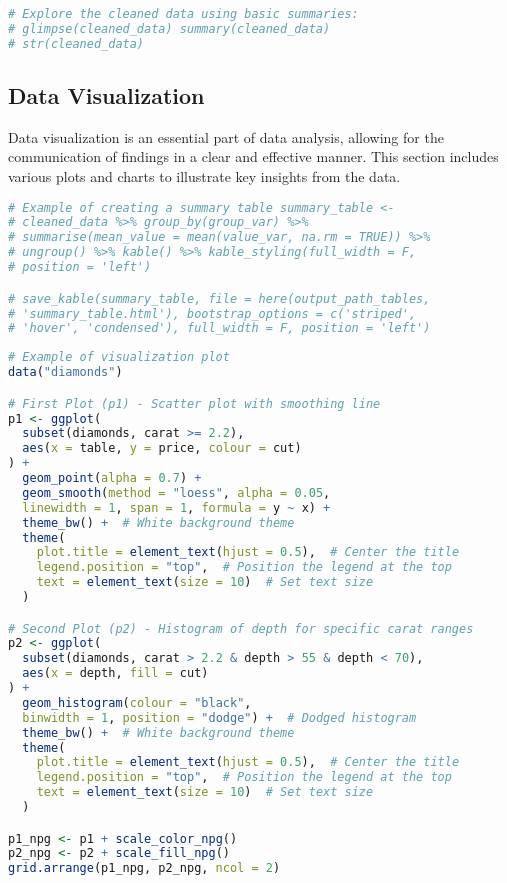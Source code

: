 \documentclass[
  12pt,
]{article}
\begin{document}
\begin{lstlisting}[language=R]
# Explore the cleaned data using basic summaries:
# glimpse(cleaned_data) summary(cleaned_data)
# str(cleaned_data)
\end{lstlisting}

\subsection{Data Visualization}\label{data-visualization}

Data visualization is an essential part of data analysis, allowing for
the communication of findings in a clear and effective manner. This
section includes various plots and charts to illustrate key insights
from the data.

\begin{lstlisting}[language=R]
# Example of creating a summary table summary_table <-
# cleaned_data %>% group_by(group_var) %>%
# summarise(mean_value = mean(value_var, na.rm = TRUE)) %>%
# ungroup() %>% kable() %>% kable_styling(full_width = F,
# position = 'left')

# save_kable(summary_table, file = here(output_path_tables,
# 'summary_table.html'), bootstrap_options = c('striped',
# 'hover', 'condensed'), full_width = F, position = 'left')
\end{lstlisting}

\begin{lstlisting}[language=R]
# Example of visualization plot
data("diamonds")

# First Plot (p1) - Scatter plot with smoothing line
p1 <- ggplot(
  subset(diamonds, carat >= 2.2),
  aes(x = table, y = price, colour = cut)
) +
  geom_point(alpha = 0.7) +  
  geom_smooth(method = "loess", alpha = 0.05,
  linewidth = 1, span = 1, formula = y ~ x) +  
  theme_bw() +  # White background theme
  theme(
    plot.title = element_text(hjust = 0.5),  # Center the title
    legend.position = "top",  # Position the legend at the top
    text = element_text(size = 10)  # Set text size
  )

# Second Plot (p2) - Histogram of depth for specific carat ranges
p2 <- ggplot(
  subset(diamonds, carat > 2.2 & depth > 55 & depth < 70),
  aes(x = depth, fill = cut)
) +
  geom_histogram(colour = "black",
  binwidth = 1, position = "dodge") +  # Dodged histogram
  theme_bw() +  # White background theme
  theme(
    plot.title = element_text(hjust = 0.5),  # Center the title
    legend.position = "top",  # Position the legend at the top
    text = element_text(size = 10)  # Set text size
  )

p1_npg <- p1 + scale_color_npg()
p2_npg <- p2 + scale_fill_npg()
grid.arrange(p1_npg, p2_npg, ncol = 2)
\end{lstlisting}
\end{document}
